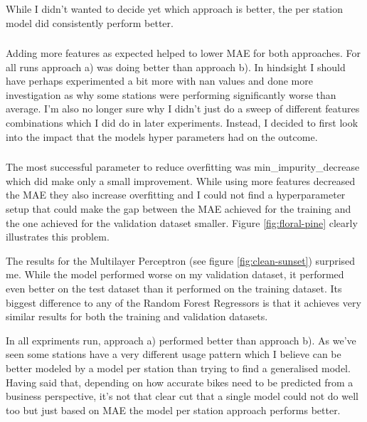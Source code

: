 \documentclass[a4paper]{article}
\begin{document}
    While I didn't wanted to decide yet which approach is better, the per station model did consistently
    perform better.

    \subsubsection*{}
    Adding more features as expected helped to lower MAE for both approaches. For all runs approach a) was
    doing better than approach b). In hindsight I should have perhaps experimented a bit more with nan values and
    done more investigation as why some stations were performing significantly worse than average. I'm also
    no longer sure why I didn't just do a sweep of different features combinations which I did do in later experiments.
    Instead, I decided to first look into the impact that the models hyper parameters had on the outcome.

    \subsubsection*{}

    The most successful parameter to reduce overfitting was min\_impurity\_decrease which did make only
    a small improvement. While using more features decreased the MAE they also increase overfitting and I
    could not find a hyperparameter setup that could make the gap between the MAE achieved for the training and the one achieved
    for the validation dataset smaller. Figure \ref{fig:floral-pine} clearly illustrates this problem.

    The results for the Multilayer Perceptron (see figure \ref{fig:clean-sunset}) surprised me. While the model performed
    worse on my validation dataset, it performed even better on the test dataset than it performed on the training dataset.
    Its biggest difference to any of the Random Forest Regressors is that it achieves very similar results for both the
    training and validation datasets.

    In all expriments run, approach a) performed better than approach b). As we've seen some stations have a very different
    usage pattern which I believe can be better modeled by a model per station than trying to find a generalised model.
    Having said that, depending on how accurate bikes need to be predicted from a business perspective, it's not that clear
    cut that a single model could not do well too but just based on MAE the model per station approach performs better.
\end{document}
